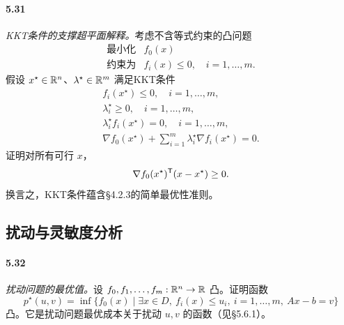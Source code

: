 \paragraph{5.31} \emph{KKT条件的支撑超平面解释。}考虑不含等式约束的凸问题
\[
\begin{array}{ll}\text{最小化}&f_0(x)\\
\text{约束为}&f_i(x)\le0,\quad i=1,\ldots,m.\end{array}
\]
假设 $x^\star\in\mathbb R^n$、$\lambda^\star\in\mathbb R^m$ 满足KKT条件
\[
\begin{gathered}
f_i(x^\star)\le0,\quad i=1,\ldots,m,\\
\lambda_i^\star\ge0,\quad i=1,\ldots,m,\\
\lambda_i^\star f_i(x^\star)=0,\quad i=1,\ldots,m,\\
\nabla f_0(x^\star)+\sum_{i=1}^m\lambda_i^\star\nabla f_i(x^\star)=0.
\end{gathered}
\]
证明对所有可行 $x$，
\[
\nabla f_0(x^\star)^\mathsf T(x-x^\star)\ge0.
\]
换言之，KKT条件蕴含§4.2.3的简单最优性准则。

\subsection*{扰动与灵敏度分析}
\paragraph{5.32} \emph{扰动问题的最优值。}设 $f_0,f_1,\ldots,f_m:\mathbb R^n\to\mathbb R$ 凸。证明函数
\[
p^\star(u,v)=\inf\{f_0(x)\mid\exists x\in D,\ f_i(x)\le u_i,\ i=1,\ldots,m,\ Ax-b=v\}
\]
凸。它是扰动问题最优成本关于扰动 $u,v$ 的函数（见§5.6.1）。

